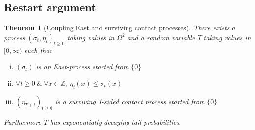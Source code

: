 \documentclass{article}
\theoremstyle{slimTheoremStyle} %
\newtheorem{theorem}{Theorem}[section]
\theoremstyle{slimDefinitionStyle}
\theoremstyle{remark}
\newcommand{\Z}{\mathbb{Z}}
\begin{document}
\subsection{Restart argument}

\begin{theorem}[Coupling East and surviving contact processes]\label{thm:restart_coupling}
There exists a process $(\sigma_t, \eta_t)_{t \geq 0}$ taking values in $\Omega^2$ and a random variable $T$ taking values in $[0, \infty)$ such that 
\begin{enumerate}[(i)]
  \item $(\sigma_t)$ is an East-process started from $\{0\}$
  \item $\forall t \geq 0\ \&\ \forall x \in \Z,\ \eta_t(x) \leq \sigma_t(x)$
  \item $(\eta_{T+t})_{t \geq 0}$ is a surviving 1-sided contact process started from $\{0\}$
\end{enumerate}
Furthermore $T$ has exponentially decaying tail probabilities. 
\end{theorem}
\end{document}
